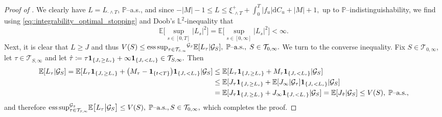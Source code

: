 \documentclass[10pt]{article} %
\newcommand\cG{\mathcal G}
\newcommand\cT{\mathcal T}
\newcommand{\smalltext}[1]{\text{\fontsize{4}{4}\selectfont$#1$}}
\def \E{\mathbb{E}}
\def \L{\mathbb{L}}
\def \P{\mathbb{P}}
\newcommand{\1}{\mathbf{1}}
\def\d{\mathrm{d}}
\DeclareMathOperator*{\esssup}{ess\,sup}
\begin{document}
\begin{proof}[Proof of ]
	We clearly have $L = L_{\cdot \land T}$, $\P$--a.s., and since $-|M| - 1 \leq L \leq \xi_{\cdot \land T}^+ + \int_0^T |f_u| \d C_u + |M| + 1,$ up to $\P$--indistinguishability, we find using \eqref{eq::integrability_optimal_stopping} and Doob's $\L^2$-inequality that
	\begin{equation*}
		\E\bigg[\sup_{s \in [0,T]} |L_s|^2\bigg] = \E\bigg[\sup_{s \in [0,\infty]} |L_s|^2\bigg] < \infty.
	\end{equation*}
	Next, it is clear that $L \geq J$ and thus $V(S) \leq {\esssup_{\tau \in \cT_{\smalltext{S}\smalltext{,}\smalltext{\infty}}}}^{\cG_\smalltext{S}} \E[L_\tau |\cG_S], \; \text{$\P$--a.s.}, \; S \in \cT_{0,\infty}.$ We turn to the converse inequality. Fix $S \in \cT_{0,\infty}$, let $\tau \in \cT_{S,\infty}$ and let $\hat\tau \coloneqq \tau \mathbf{1}_{\{J_\smalltext{\tau} \geq L_\smalltext{\tau}\}} + \infty \mathbf{1}_{\{J_\smalltext{\tau} < L_\smalltext{\tau}\}} \in \cT_{S,\infty}.$ Then
	\begin{align*}
		\E[L_{\tau}| \cG_S] = \E[L_{\tau} \mathbf{1}_{\{J_\smalltext{\tau} \geq L_\smalltext{\tau}\}} + \big(M_\tau - \mathbf{1}_{\{t < T\}}\big)\mathbf{1}_{\{J_\smalltext{\tau} < L_\smalltext{\tau}\}}| \cG_S]  
		&\leq \E[L_\tau \mathbf{1}_{\{J_\smalltext{\tau} \geq L_\smalltext{\tau}\}} + M_\tau\mathbf{1}_{\{J_\smalltext{\tau} < L_\smalltext{\tau}\}}| \cG_S] \\
		&\leq \E[J_\tau \mathbf{1}_{\{J_\smalltext{\tau} \geq L_\smalltext{\tau}\}} + \E[J_\infty | \cG_\tau]\mathbf{1}_{\{J_\smalltext{\tau} < L_\smalltext{\tau}\}}| \cG_S] \\
		&= \E[J_\tau \mathbf{1}_{\{J_\smalltext{\tau} \geq L_\smalltext{\tau}\}} + J_\infty\mathbf{1}_{\{J_\smalltext{\tau} < L_\smalltext{\tau}\}}| \cG_S] = \E[J_{\hat\tau}| \cG_S] \leq V(S), \; \text{$\P$--a.s.},
	\end{align*}
	and therefore ${\esssup^{\cG_\smalltext{S}}_{\tau \in \cT_{\smalltext{S}\smalltext{,}\smalltext{\infty}}}} \E\big[ L_\tau \big| \cG_S\big] \leq V(S), \; \text{$\P$--a.s.}, S \in \cT_{0,\infty},$ which completes the proof.
\end{proof}
\end{document}
